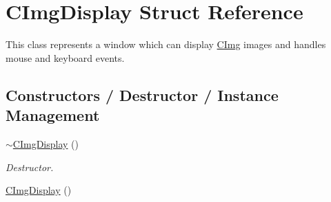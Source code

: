 \hypertarget{structcimg__library_1_1CImgDisplay}{
\section{CImgDisplay Struct Reference}
\label{structcimg__library_1_1CImgDisplay}
}


This class represents a window which can display \hyperlink{structcimg__library_1_1CImg}{CImg} images and handles mouse and keyboard events.  


\subsection*{Constructors / Destructor / Instance Management}
\label{_amgrp40aea8b807100c67fa0d7b630c9c7060}
 \begin{DoxyCompactItemize}
\item 
\hypertarget{structcimg__library_1_1CImgDisplay_ae4b8135f23d41f2077ff1d63deb452ea}{
\hyperlink{structcimg__library_1_1CImgDisplay_ae4b8135f23d41f2077ff1d63deb452ea}{$\sim$CImgDisplay} ()}
\label{structcimg__library_1_1CImgDisplay_ae4b8135f23d41f2077ff1d63deb452ea}

\begin{DoxyCompactList}\small\item\em Destructor. \item\end{DoxyCompactList}\item 
\hypertarget{structcimg__library_1_1CImgDisplay_a54e3407c3b858f5f40283264e39b4f38}{
\hyperlink{structcimg__library_1_1CImgDisplay_a54e3407c3b858f5f40283264e39b4f38}{CImgDisplay} ()}
\label{structcimg__library_1_1CImgDisplay_a54e3407c3b858f5f40283264e39b4f38}


\end{DoxyCompactItemize}
